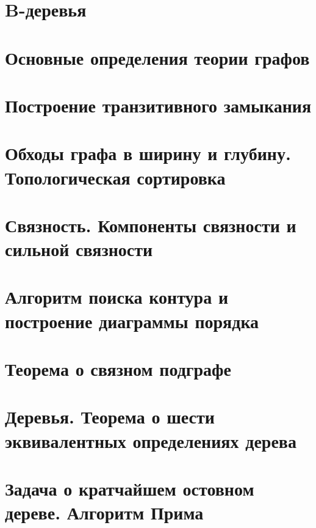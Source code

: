 \documentclass[12pt, fleqn]{article}
\begin{document}


\section{B-деревья}




\section{Основные определения теории графов}


\section{Построение транзитивного замыкания}


\section{Обходы графа в ширину и глубину. Топологическая сортировка}


\section{Связность. Компоненты связности и сильной связности}


\section{Алгоритм поиска контура и построение диаграммы порядка}


\section{Теорема о связном подграфе}


\section{Деревья. Теорема о шести эквивалентных определениях дерева}


\section{Задача о кратчайшем остовном дереве. Алгоритм Прима}
\end{document}
